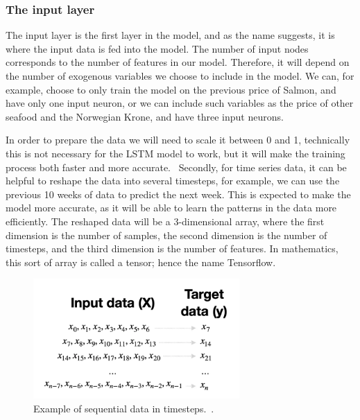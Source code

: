 \subsubsection{The input layer}
The input layer is the first layer in the model, and as the name suggests, it is where the input data is fed into the model. The number of input nodes corresponds to the number of features in our model. Therefore, it will depend on the number of exogenous variables we choose to include in the model. We can, for example, choose to only train the model on the previous price of Salmon, and have only one input neuron, or we can include such variables as the price of other seafood and the Norwegian Krone, and have three input neurons. 

In order to prepare the data we will need to scale it between 0 and 1, technically this is not necessary for the LSTM model to work, but it will make the training process both faster and more accurate.~\parencite{brownlee_2019} Secondly, for time series data, it can be helpful to reshape the data into several timesteps, for example, we can use the previous 10 weeks of data to predict the next week. This is expected to make the model more accurate, as it will be able to learn the patterns in the data more efficiently. The reshaped data will be a 3-dimensional array, where the first dimension is the number of samples, the second dimension is the number of timesteps, and the third dimension is the number of features. In mathematics, this sort of array is called a tensor; hence the name Tensorflow.~\parencite{tensorflow_tensors_2023}
\begin{figure}[H]
    \centering
    \includegraphics[width=0.7\textwidth]{data/Figures/Neural networks/Sequential_data.png}
    \caption[Example of sequential data in timesteps.]{Example of sequential data in timesteps.~\cite{dobilas_2022}.}\label{fig:Sequential_data}
\end{figure}

